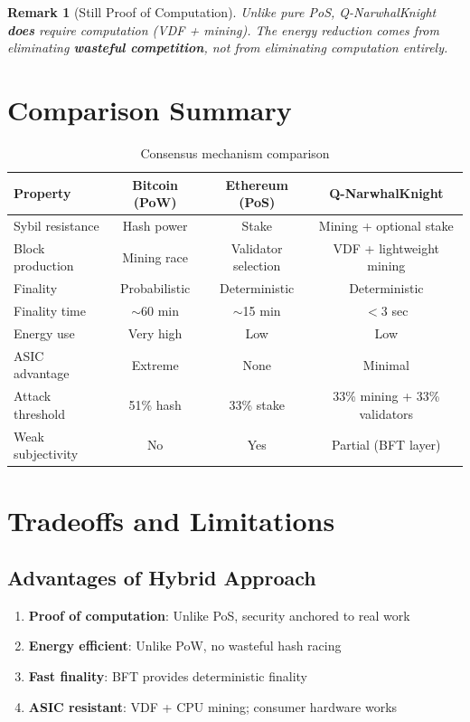 \documentclass[11pt,a4paper]{article}
\newtheorem{remark}[theorem]{Remark}
\begin{document}
\begin{remark}[Still Proof of Computation]
Unlike pure PoS, Q-NarwhalKnight \textbf{does} require computation (VDF + mining). The energy reduction comes from eliminating \textbf{wasteful competition}, not from eliminating computation entirely.
\end{remark}

\section{Comparison Summary}

\begin{table}[h]
\centering
\begin{tabular}{lccc}
\toprule
Property & Bitcoin (PoW) & Ethereum (PoS) & Q-NarwhalKnight \\
\midrule
Sybil resistance & Hash power & Stake & Mining + optional stake \\
Block production & Mining race & Validator selection & VDF + lightweight mining \\
Finality & Probabilistic & Deterministic & Deterministic \\
Finality time & $\sim$60 min & $\sim$15 min & $<$3 sec \\
Energy use & Very high & Low & Low \\
ASIC advantage & Extreme & None & Minimal \\
Attack threshold & 51\% hash & 33\% stake & 33\% mining + 33\% validators \\
Weak subjectivity & No & Yes & Partial (BFT layer) \\
\bottomrule
\end{tabular}
\caption{Consensus mechanism comparison}
\end{table}

\section{Tradeoffs and Limitations}

\subsection{Advantages of Hybrid Approach}

\begin{enumerate}
    \item \textbf{Proof of computation}: Unlike PoS, security anchored to real work
    \item \textbf{Energy efficient}: Unlike PoW, no wasteful hash racing
    \item \textbf{Fast finality}: BFT provides deterministic finality
    \item \textbf{ASIC resistant}: VDF + CPU mining; consumer hardware works
\end{enumerate}
\end{document}
